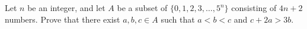 Let $n$ be an integer, and let $A$ be a subset of $\{0, 1, 2, 3, \ldots, 5^n\}$ consisting of $4n + 2$ numbers. Prove that there exist $a, b, c \in A$ such that $a < b < c$ and $c + 2a > 3b$.
